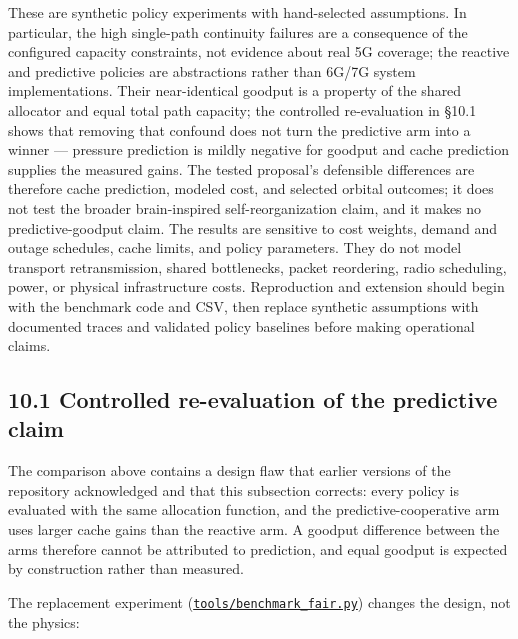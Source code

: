 \documentclass[
  american,
  11pt,
]{article}
\begin{document}
These are synthetic policy experiments with hand-selected assumptions.
In particular, the high single-path continuity failures are a
consequence of the configured capacity constraints, not evidence about
real 5G coverage; the reactive and predictive policies are abstractions
rather than 6G/7G system implementations. Their near-identical goodput
is a property of the shared allocator and equal total path capacity; the
controlled re-evaluation in §10.1 shows that removing that confound does
not turn the predictive arm into a winner --- pressure prediction is
mildly negative for goodput and cache prediction supplies the measured
gains. The tested proposal's defensible differences are therefore cache
prediction, modeled cost, and selected orbital outcomes; it does not
test the broader brain-inspired self-reorganization claim, and it makes
no predictive-goodput claim. The results are sensitive to cost weights,
demand and outage schedules, cache limits, and policy parameters. They
do not model transport retransmission, shared bottlenecks, packet
reordering, radio scheduling, power, or physical infrastructure costs.
Reproduction and extension should begin with the benchmark code and CSV,
then replace synthetic assumptions with documented traces and validated
policy baselines before making operational claims.

\subsection{10.1 Controlled re-evaluation of the predictive
claim}\label{controlled-re-evaluation-of-the-predictive-claim}

The comparison above contains a design flaw that earlier versions of the
repository acknowledged and that this subsection corrects: every policy
is evaluated with the same allocation function, and the
predictive-cooperative arm uses larger cache gains than the reactive
arm. A goodput difference between the arms therefore cannot be
attributed to prediction, and equal goodput is expected by construction
rather than measured.

The replacement experiment
(\href{../tools/benchmark_fair.py}{\texttt{tools/benchmark\_fair.py}})
changes the design, not the physics:
\end{document}
